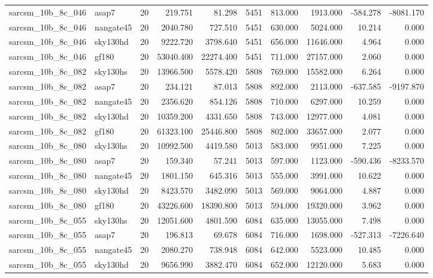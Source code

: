 \begin{longtable}{llrrrrrrrr}
sarcsm\_10b\_8c\_046 & asap7 & 20 & 219.751 & 81.298 & 5451 & 813.000 & 1913.000 & -584.278 & -8081.170 \\
sarcsm\_10b\_8c\_046 & nangate45 & 20 & 2040.780 & 727.510 & 5451 & 630.000 & 5024.000 & 10.214 & 0.000 \\
sarcsm\_10b\_8c\_046 & sky130hd & 20 & 9222.720 & 3798.640 & 5451 & 656.000 & 11646.000 & 4.964 & 0.000 \\
sarcsm\_10b\_8c\_046 & gf180 & 20 & 53040.400 & 22274.400 & 5451 & 711.000 & 27157.000 & 2.060 & 0.000 \\
sarcsm\_10b\_8c\_082 & sky130hs & 20 & 13966.500 & 5578.420 & 5808 & 769.000 & 15582.000 & 6.264 & 0.000 \\
sarcsm\_10b\_8c\_082 & asap7 & 20 & 234.121 & 87.013 & 5808 & 892.000 & 2113.000 & -637.585 & -9197.870 \\
sarcsm\_10b\_8c\_082 & nangate45 & 20 & 2356.620 & 854.126 & 5808 & 710.000 & 6297.000 & 10.259 & 0.000 \\
sarcsm\_10b\_8c\_082 & sky130hd & 20 & 10359.200 & 4331.650 & 5808 & 743.000 & 12977.000 & 4.081 & 0.000 \\
sarcsm\_10b\_8c\_082 & gf180 & 20 & 61323.100 & 25446.800 & 5808 & 802.000 & 33657.000 & 2.077 & 0.000 \\
sarcsm\_10b\_8c\_080 & sky130hs & 20 & 10992.500 & 4419.580 & 5013 & 583.000 & 9951.000 & 7.225 & 0.000 \\
sarcsm\_10b\_8c\_080 & asap7 & 20 & 159.340 & 57.241 & 5013 & 597.000 & 1123.000 & -590.436 & -8233.570 \\
sarcsm\_10b\_8c\_080 & nangate45 & 20 & 1801.150 & 645.316 & 5013 & 555.000 & 3991.000 & 10.622 & 0.000 \\
sarcsm\_10b\_8c\_080 & sky130hd & 20 & 8423.570 & 3482.090 & 5013 & 569.000 & 9064.000 & 4.887 & 0.000 \\
sarcsm\_10b\_8c\_080 & gf180 & 20 & 43226.600 & 18390.800 & 5013 & 594.000 & 19320.000 & 3.962 & 0.000 \\
sarcsm\_10b\_8c\_055 & sky130hs & 20 & 12051.600 & 4801.590 & 6084 & 635.000 & 13055.000 & 7.498 & 0.000 \\
sarcsm\_10b\_8c\_055 & asap7 & 20 & 196.813 & 69.678 & 6084 & 716.000 & 1698.000 & -527.313 & -7226.640 \\
sarcsm\_10b\_8c\_055 & nangate45 & 20 & 2080.270 & 738.948 & 6084 & 642.000 & 5523.000 & 10.485 & 0.000 \\
sarcsm\_10b\_8c\_055 & sky130hd & 20 & 9656.990 & 3882.470 & 6084 & 652.000 & 12120.000 & 5.683 & 0.000 \\

\end{longtable}
